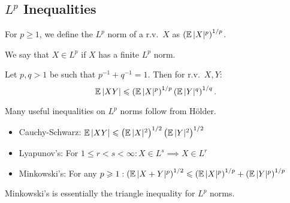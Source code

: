 \subsection{$L^p$ Inequalities}

\begin{definition}[$L^p$ norm of a r.v.]
    For $p\geq 1$, we define the $L^p$ norm of a r.v.\ $X$ as 
    $\left( \operatorname*{\mathbb{E}} |X|^p \right)^{1/p}$. 

    We say that $X \in L^p$ if $X$ has a finite $L^p$ norm.
\end{definition}

\begin{theorem}
    Let $p,q > 1$ be such that $p^{-1} + q^{-1} = 1$. Then for r.v.\
    $X, Y$:
    \[
        \operatorname*{\mathbb{E}} |XY|
        \leqslant
        \left( \operatorname*{\mathbb{E}} |X|^p \right)^{1/p}
        \left( \operatorname*{\mathbb{E}} |Y|^q \right)^{1/q}.
    \]
\end{theorem}

Many useful inequalities on $L^p$ norms follow from H\"older.

\begin{itemize}
    \item Cauchy-Schwarz: $\operatorname*{\mathbb{E}} |XY|
        \leqslant
        \left( \operatorname*{\mathbb{E}} |X|^2 \right)^{1/2}
        \left( \operatorname*{\mathbb{E}} |Y|^2 \right)^{1/2}$
    \item Lyapunov's: For $1 \leq r < s < \infty: X \in L^s \implies X \in L^r$
    \item Minkowski's: For any $p \geqslant 1: \left( \operatorname*{\mathbb{E}} |X+Y|^p \right)^{1/2} \leqslant \left( \operatorname*{\mathbb{E}} |X|^p \right)^{1/p}
    + \left( \operatorname*{\mathbb{E}} |Y|^p \right)^{1/p}$ 
\end{itemize}

Minkowski's is essentially the triangle inequality for $L^p$ norms.

